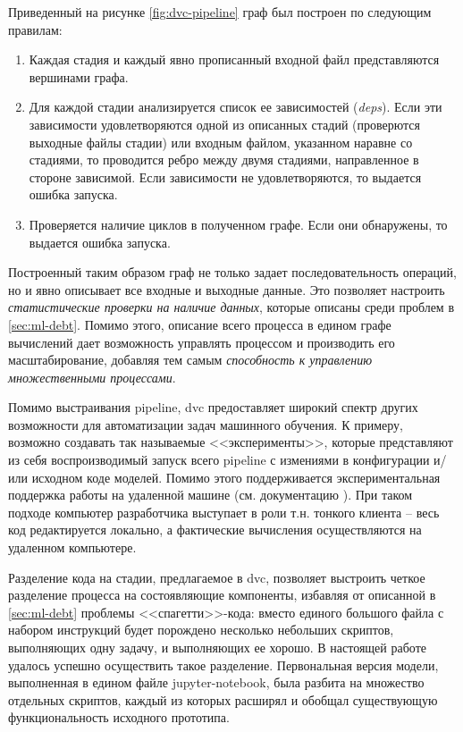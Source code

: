 Приведенный на рисунке \ref{fig:dvc-pipeline} граф был построен по следующим правилам:
\begin{enumerate}
    \item Каждая стадия и каждый явно прописанный входной файл представляются вершинами графа.
    \item Для каждой стадии анализируется список ее зависимостей (\textit{deps}).
        Если эти зависимости удовлетворяются одной из описанных стадий (проверются выходные файлы стадии) или входным файлом, указанном наравне со стадиями, то проводится ребро между двумя стадиями, направленное в стороне зависимой.
        Если зависимости не удовлетворяются, то выдается ошибка запуска.
    \item Проверяется наличие циклов в полученном графе.
        Если они обнаружены, то выдается ошибка запуска.
\end{enumerate}
Построенный таким образом граф не только задает последовательность операций, но и явно описывает все входные и выходные данные.
Это позволяет настроить \textit{статистические проверки на наличие данных}, которые описаны среди проблем в \ref{sec:ml-debt}.
Помимо этого, описание всего процесса в едином графе вычислений дает возможность управлять процессом и производить его масштабирование, добавляя тем самым \textit{способность к управлению множественными процессами}.

Помимо выстраивания \gls{pipeline}, \gls{dvc} предоставляет широкий спектр других возможности для автоматизации задач машинного обучения.
К примеру, возможно создавать так называемые <<эксперименты>>, которые представляют из себя воспроизводимый запуск всего \gls{pipeline} с измениями в конфигурации и/или исходном коде моделей.
Помимо этого поддерживается экспериментальная поддержка работы на удаленной машине (см. документацию \cite{cite:dvc}).
При таком подходе компьютер разработчика выступает в роли т.н. тонкого клиента -- весь код редактируется локально, а фактические вычисления осуществляются на удаленном компьютере.

Разделение кода на стадии, предлагаемое в \gls{dvc}, позволяет выстроить четкое разделение процесса на состоявляющие компоненты, избавляя от описанной в \ref{sec:ml-debt} проблемы <<спагетти>>-кода: вместо единого большого файла с набором инструкций будет порождено несколько небольших скриптов, выполняющих одну задачу, и выполняющих ее хорошо.
В настоящей работе удалось успешно осуществить такое разделение.
Первональная версия модели, выполненная в едином файле \gls{jupyter-notebook}, была разбита на множество отдельных скриптов, каждый из которых расширял и обобщал существующую функциональность исходного прототипа.
